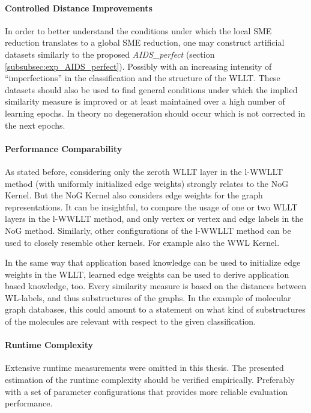    	\paragraph{Controlled Distance Improvements}
   	In order to better understand the conditions under which the local SME reduction translates to a global SME reduction, one may construct artificial datasets similarly to the proposed \textit{AIDS\_perfect} (section  \ref{subsubsec:exp_AIDS_perfect}).
   	Possibly with an increasing intensity of \enquote{imperfections} in the classification and the structure of the WLLT.
   	These datasets should also be used to find general conditions under which the implied similarity measure is improved or at least maintained over a high number of learning epochs.
   	In theory no degeneration should occur which is not corrected in the next epochs.
   	   	
   	\paragraph{Performance Comparability}
   	As stated before, considering only the zeroth WLLT layer in the l-WWLLT method (with uniformly initialized edge weights) strongly relates to the NoG Kernel.
   	But the NoG Kernel also considers edge weights for the graph representations.
   	It can be insightful, to compare the usage of one or two WLLT layers in the l-WWLLT method, and only vertex or vertex and edge labels in the NoG method.
   	Similarly, other configurations of the l-WWLLT method can be used to closely resemble other kernels.
   	For example also the WWL Kernel.
   	
   	In the same way that application based knowledge can be used to initialize edge weights in the WLLT, learned edge weights can be used to derive application based knowledge, too.
   	Every similarity measure is based on the distances between WL-labels, and thus substructures of the graphs.
   	In the example of molecular graph databases, this could amount to a statement on what kind of substructures of the molecules are relevant with respect to the given classification.
   	   	   	
   	\paragraph{Runtime Complexity}
   	Extensive runtime measurements were omitted in this thesis.
   	The presented estimation of the runtime complexity should be verified empirically.
   	Preferably with a set of parameter configurations that provides more reliable evaluation performance.
   	
